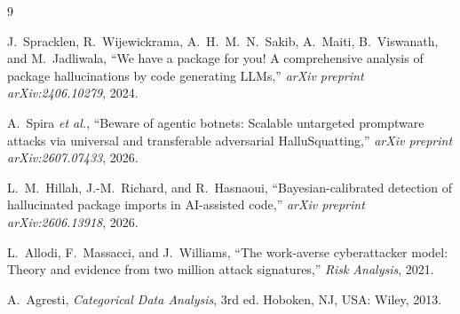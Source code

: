 \documentclass[journal]{IEEEtran}
\begin{document}
\begin{thebibliography}{9}

J.~Spracklen, R.~Wijewickrama, A.~H.~M.~N.~Sakib, A.~Maiti, B.~Viswanath, and M.~Jadliwala, ``We have a package for you! A comprehensive analysis of package hallucinations by code generating LLMs,'' \textit{arXiv preprint arXiv:2406.10279}, 2024.

A.~Spira \textit{et al.}, ``Beware of agentic botnets: Scalable untargeted promptware attacks via universal and transferable adversarial HalluSquatting,'' \textit{arXiv preprint arXiv:2607.07433}, 2026.

L.~M.~Hillah, J.-M.~Richard, and R.~Hasnaoui, ``Bayesian-calibrated detection of hallucinated package imports in AI-assisted code,'' \textit{arXiv preprint arXiv:2606.13918}, 2026.

L.~Allodi, F.~Massacci, and J.~Williams, ``The work-averse cyberattacker model: Theory and evidence from two million attack signatures,'' \textit{Risk Analysis}, 2021.

A.~Agresti, \textit{Categorical Data Analysis}, 3rd ed. Hoboken, NJ, USA: Wiley, 2013.

\end{thebibliography}
\end{document}
